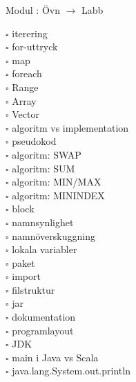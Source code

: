 
Modul : Övn  $\rightarrow$ Labb \Alert{\texttt{--}}
\begin{multicols}{3}\SlideFontTiny
$\square$ iterering \\
$\square$ for-uttryck \\
$\square$ map \\
$\square$ foreach \\
$\square$ Range \\
$\square$ Array \\
$\square$ Vector \\
$\square$ algoritm vs implementation \\
$\square$ pseudokod \\
$\square$ algoritm: SWAP \\
$\square$ algoritm: SUM \\
$\square$ algoritm: MIN/MAX \\
$\square$ algoritm: MININDEX \\
$\square$ block \\
$\square$ namnsynlighet \\
$\square$ namnöverskuggning \\
$\square$ lokala variabler \\
$\square$ paket \\
$\square$ import \\
$\square$ filstruktur \\
$\square$ jar \\
$\square$ dokumentation \\
$\square$ programlayout \\
$\square$ JDK \\
$\square$ main i Java vs Scala \\
$\square$ java.lang.System.out.println \\     
\end{multicols}

